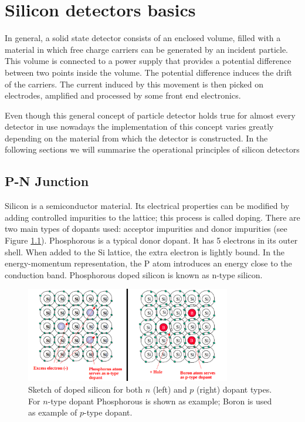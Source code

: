 \chapter{Silicon detectors basics} %
\label{chap:detector}

In general, a solid state detector consists of an enclosed volume, filled with a material in
which free charge carriers can be generated by an incident particle. This volume
is connected to a power supply that provides a  potential difference between two
points inside the volume. The potential difference induces the drift of the
carriers. The current induced by this movement is then picked on electrodes,
amplified and processed by some front end electronics.

Even though this general concept of particle detector holds true for almost
every detector in use nowadays the implementation of this concept varies greatly
depending on the material from which the detector is constructed. In the
following sections we will summarise the operational principles of silicon
detectors

\section{P-N Junction}

Silicon is a semiconductor material. Its electrical properties can be modified
by adding controlled impurities to the lattice; this process is called doping.
There are two main types of dopants used: acceptor impurities and donor
impurities (see Figure \ref{fig:dopingSi}). Phosphorous is a typical donor dopant. It has 5 electrons in its
outer shell. When added to the Si lattice, the extra electron is lightly bound.
In the energy-momentum representation, the P atom introduces an energy close to
the conduction band. Phosphorous doped silicon is known as n-type silicon. 

\begin{figure}[H]
	\centering
	\includegraphics[width=0.8\textwidth]{Dopants_Si.png}
	\caption{Sketch of doped silicon for both $n$ (left) and $p$ (right) dopant types. For $n$-type dopant Phosphorous is shown as example; Boron is used as example of $p$-type dopant.}
	\label{fig:dopingSi}
\end{figure}

